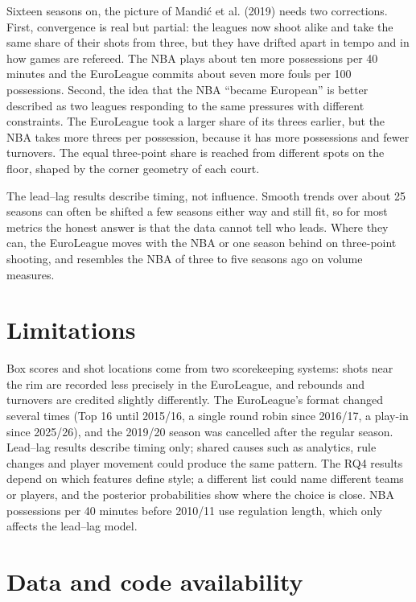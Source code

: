 \documentclass[
  11pt,
  a4paper,
]{article}
\begin{document}
Sixteen seasons on, the picture of Mandić et al. (2019) needs two
corrections. First, convergence is real but partial: the leagues now
shoot alike and take the same share of their shots from three, but they
have drifted apart in tempo and in how games are refereed. The NBA plays
about ten more possessions per 40 minutes and the EuroLeague commits
about seven more fouls per 100 possessions. Second, the idea that the
NBA ``became European'' is better described as two leagues responding to
the same pressures with different constraints. The EuroLeague took a
larger share of its threes earlier, but the NBA takes more threes per
possession, because it has more possessions and fewer turnovers. The
equal three-point share is reached from different spots on the floor,
shaped by the corner geometry of each court.

The lead--lag results describe timing, not influence. Smooth trends over
about 25 seasons can often be shifted a few seasons either way and still
fit, so for most metrics the honest answer is that the data cannot tell
who leads. Where they can, the EuroLeague moves with the NBA or one
season behind on three-point shooting, and resembles the NBA of three to
five seasons ago on volume measures.

\section{Limitations}\label{limitations}

Box scores and shot locations come from two scorekeeping systems: shots
near the rim are recorded less precisely in the EuroLeague, and rebounds
and turnovers are credited slightly differently. The EuroLeague's format
changed several times (Top 16 until 2015/16, a single round robin since
2016/17, a play-in since 2025/26), and the 2019/20 season was cancelled
after the regular season. Lead--lag results describe timing only; shared
causes such as analytics, rule changes and player movement could produce
the same pattern. The RQ4 results depend on which features define style;
a different list could name different teams or players, and the
posterior probabilities show where the choice is close. NBA possessions
per 40 minutes before 2010/11 use regulation length, which only affects
the lead--lag model.

\section{Data and code availability}\label{data-and-code-availability}
\end{document}
